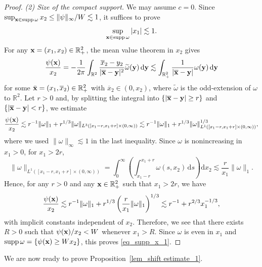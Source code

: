 \documentclass[11pt]{amsart}
\theoremstyle{definition}
\theoremstyle{definition}
\numberwithin{equation}{section}
\newcommand{\tld}[1]{\widetilde{#1}}
\newcommand{\supp}{{\mathrm{supp}}\,}
\newcommand{\0}{\emptyset}
\newcommand{\omg}{\omega}
\newcommand{\bfx}{{\bf x}}
\newcommand{\bfy}{{\bf y}}
\newcommand{\bbR}{\mathbb R}
\newcommand{\dd}{\mathrm{d}}
\begin{document}
\begin{proof}
				\medskip
				
				\noindent \textit{(2) Size of the compact support.}
				We may assume $c = 0$.
				Since $\sup_{\bfx \in \supp \omega} x_2 \le \|\psi\|_{\infty}/W \lesssim 1$, it suffices to prove
				\begin{equation}
					\label{eq_supp_x_1}
					\sup_{\bfx \in \supp \omega} |x_1| \lesssim 1.
				\end{equation}
				For any $\bfx = (x_1, x_2) \in \bbR^2_+$, the mean value theorem in $x_2$ gives
				\begin{align*}
					\frac{\psi(\bfx)}{x_2} = -\frac{1}{2\pi} \int_{\bbR^2} \frac{ \overline{x}_2 - y_2}{| \overline{\bfx} - \bfy|^2}    \tld\omega(\bfy) \, \dd\bfy \lesssim \int_{\bbR^2_+} \frac{1}{|\overline{\bfx} - \bfy|} \omega(\bfy) \, \dd\bfy
				\end{align*}
				for some $\bar{\bfx} = (x_1, \overline{x}_2) \in \bbR^2_+$ with $\overline{x}_2 \in (0, x_2)$, where $\tld\omg$ is the odd-extension of $\omg$ to $\bbR^2$.
				Let $r > 0$ and, by splitting the integral into $\{| \overline{\bfx} - \bfy|\ge r\}$ and $\{| \overline{\bfx} - \bfy|<r\}$, we estimate
				\begin{align*}
					\frac{\psi(\bfx)}{x_2}  \lesssim   r^{-1} \|\omega\|_1
					+ r^{1/3} \|\omega\|_{L^3 \left([x_1-r, x_1+r]  \times (0,\infty) \right)} \lesssim r^{-1} \|\omega\|_1
					+ r^{1/3} \|\omega\|_{L^1 \left([x_1-r, x_1+r]  \times (0,\infty) \right)}^{1/3},
				\end{align*}
				where we used $\|\omega\|_{\infty} \lesssim 1$ in the last inequality.
				Since $\omega$ is nonincreasing in $x_1 > 0$, for $x_1 > 2r$, 
				\[
				\|\omega\|_{L^1 \left([x_1-r, x_1+r]  \times (0,\infty) \right)} = \int_0^{\infty} \left( \int_{x_1 -r}^{x_1 + r} \omega(s, x_2) \, \dd s \right) \dd x_2 \lesssim \frac{r}{x_1} \|\omega\|_1.
				\]
				Hence, for any $r > 0$ and any $\bfx \in \bbR^2_+$ such that $x_1 > 2r$, we have
				\[
				\frac{\psi(\bfx)}{x_2}  \lesssim r^{-1} \|\omega\|_1 + r^{1/3} \left( \frac{r}{x_1} \|\omega\|_1 \right)^{1/3} \lesssim r^{-1} + r^{2/3}x_1^{-1/3},
				\]
				with implicit constants independent of $x_2$.
				Therefore, we see that there exists $R > 0$ such that $\psi(\bfx)/x_2 < W$ whenever $x_1 > R$.
				Since $\omega$ is even in $x_1$ and $\supp \omega = \{  \psi(\bfx) \ge Wx_2 \}$, this proves \eqref{eq_supp_x_1}.
			\end{proof}
			
			
			We are now ready to prove Proposition~\ref{lem_shift estimate_1}.
			
\end{document}

